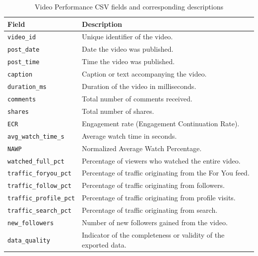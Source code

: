 \begin{table}[H]
\centering
\begin{tabular}{p{} p{}}
\toprule
\textbf{Field} & \textbf{Description} \\
\midrule
\texttt{video\_id} & Unique identifier of the video. \\
\texttt{post\_date} & Date the video was published. \\
\texttt{post\_time} & Time the video was published. \\
\texttt{caption} & Caption or text accompanying the video. \\
\texttt{duration\_ms} & Duration of the video in milliseconds. \\
\texttt{comments} & Total number of comments received. \\
\texttt{shares} & Total number of shares. \\
\texttt{ECR} & Engagement rate (Engagement Continuation Rate). \\
\texttt{avg\_watch\_time\_s} & Average watch time in seconds. \\
\texttt{NAWP} & Normalized Average Watch Percentage. \\
\texttt{watched\_full\_pct} & Percentage of viewers who watched the entire video. \\
\texttt{traffic\_foryou\_pct} & Percentage of traffic originating from the For You feed. \\
\texttt{traffic\_follow\_pct} & Percentage of traffic originating from followers. \\
\texttt{traffic\_profile\_pct} & Percentage of traffic originating from profile visits. \\
\texttt{traffic\_search\_pct} & Percentage of traffic originating from search. \\
\texttt{new\_followers} & Number of new followers gained from the video. \\
\texttt{data\_quality} & Indicator of the completeness or validity of the exported data. \\
\bottomrule
\end{tabular}
\caption{Video Performance CSV fields and corresponding descriptions}
\label{tab:video_performance_csv}
\end{table}

